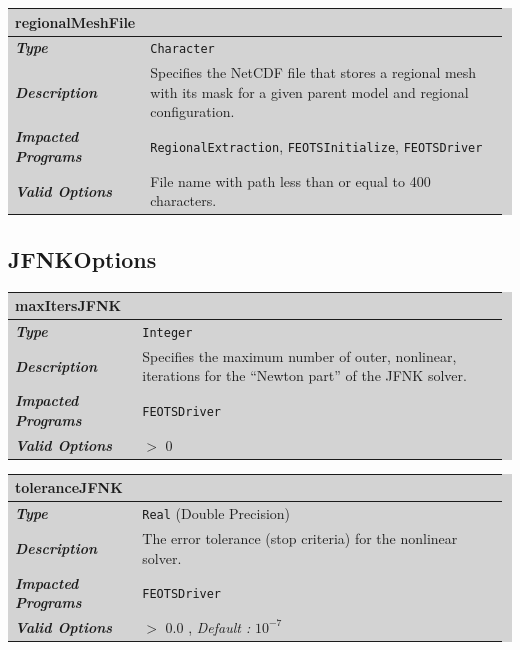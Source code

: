 \documentclass{softwaremanual}
\begin{document}
\noindent\begingroup\setlength{\fboxsep}{0pt}
\colorbox{lightgray}{
\begin{tabular}{p{0.25\linewidth} p{0.725\linewidth}}
\toprule
\textbf{regionalMeshFile} & \\
\midrule
\textbf{\textit{Type}} & \texttt{Character} \\
\midrule
\textbf{\textit{Description}} & Specifies the NetCDF file that stores a regional mesh with its mask for a given parent model and regional configuration. \\
\midrule
\textbf{\textit{Impacted Programs}} & \texttt{RegionalExtraction}, \texttt{FEOTSInitialize}, \texttt{FEOTSDriver} \\
\midrule
\textbf{\textit{Valid Options}}  & File name with path less than or equal to 400 characters. \\
\bottomrule
\end{tabular}
}\endgroup

\subsection{JFNKOptions}

\noindent\begingroup\setlength{\fboxsep}{0pt}
\colorbox{lightgray}{
\begin{tabular}{p{0.25\linewidth} p{0.725\linewidth}}
\toprule
\textbf{maxItersJFNK} & \\
\midrule
\textbf{\textit{Type}} & \texttt{Integer} \\
\midrule
\textbf{\textit{Description}} & Specifies the maximum number of outer, nonlinear, iterations for the ``Newton part'' of the JFNK solver. \\
\midrule
\textbf{\textit{Impacted Programs}} & \texttt{FEOTSDriver} \\
\midrule
\textbf{\textit{Valid Options}}  & $>$ 0\\
\bottomrule
\end{tabular}
}\endgroup

\noindent\begingroup\setlength{\fboxsep}{0pt}
\colorbox{lightgray}{
\begin{tabular}{p{0.25\linewidth} p{0.725\linewidth}}
\toprule
\textbf{toleranceJFNK} & \\
\midrule
\textbf{\textit{Type}} & \texttt{Real} (Double Precision) \\
\midrule
\textbf{\textit{Description}} & The error tolerance (stop criteria) for the nonlinear solver. \\
\midrule
\textbf{\textit{Impacted Programs}} & \texttt{FEOTSDriver} \\
\midrule
\textbf{\textit{Valid Options}}  & $>$ 0.0 , \textit{Default :} $10^{-7}$\\
\bottomrule
\end{tabular}
}\endgroup
\end{document}
